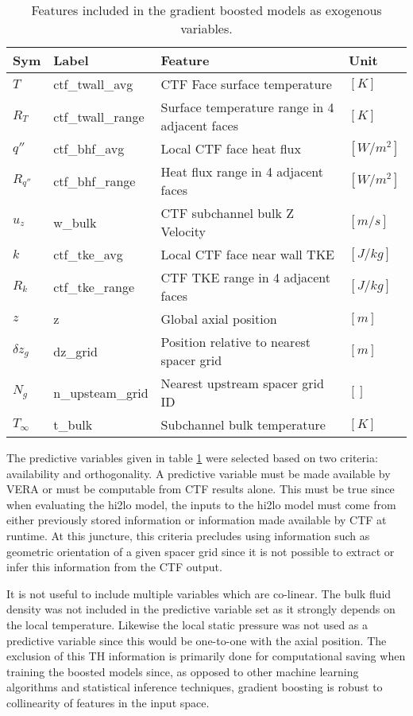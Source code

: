 \begin{table}[h]
    \begin{center}
    \caption[Included exogenous training features.]{Features included in the gradient boosted models as exogenous variables.}
\begin{tabular}[h]{|l | l | l | l |}
    \hline
    Sym & Label & Feature & Unit \\
    \hline
    \hline
    $T$ & ctf\_twall\_avg & CTF Face surface temperature & $[K]$ \\
    $R_T$ & ctf\_twall\_range & Surface temperature range in 4 adjacent faces & $[K]$ \\ 
    $q''$ & ctf\_bhf\_avg & Local CTF face heat flux & $[W/m^2]$ \\
    $R_{q''}$ & ctf\_bhf\_range & Heat flux range in 4 adjacent faces & $[W/m^2]$ \\ 
    $u_z$ & w\_bulk & CTF subchannel bulk Z Velocity &  $[m/s]$ \\
    $k$ & ctf\_tke\_avg & Local CTF face near wall TKE &  $[J/kg]$ \\
    $R_k$ & ctf\_tke\_range & CTF TKE range in 4 adjacent faces & $[J/kg]$ \\ 
    $z$ & z & Global axial position & $[m]$ \\
    $\delta z_g$ & dz\_grid & Position relative to nearest spacer grid & $[m]$ \\
    $N_g$ & n\_upsteam\_grid  & Nearest upstream spacer grid ID & $[]$ \\
    $T_\infty$ & t\_bulk & Subchannel bulk temperature  &  $[K]$ \\
    \hline
\end{tabular}
\label{tab:features}
\end{center}
\end{table}

The predictive variables given in table \ref{tab:features} were selected based on two criteria:  availability and orthogonality.  A predictive variable must be made available by VERA or must be computable from CTF results alone.  This must be true since when evaluating the hi2lo model, the inputs to the hi2lo model must come from either previously stored information or information made available by CTF at runtime.  At this juncture, this criteria precludes using information such as geometric orientation of a given spacer grid since it is not possible to extract or infer this information from the CTF output.

It is not useful to include multiple variables which are co-linear. The bulk fluid density was not included in the predictive variable set as it strongly depends on the local temperature. Likewise the local static pressure was not used as a predictive variable since this would be one-to-one with the axial position.  The exclusion of this TH information is primarily done for computational saving when training the boosted models since, as opposed to other machine learning algorithms and statistical inference techniques, gradient boosting is robust to collinearity of features in the input space. 


